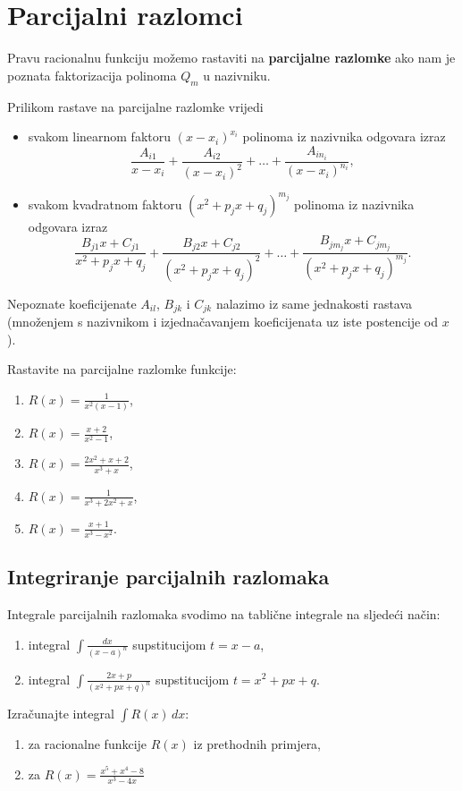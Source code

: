 
\section{Parcijalni razlomci}

Pravu racionalnu funkciju možemo rastaviti na \textbf{parcijalne razlomke} ako
nam je poznata faktorizacija polinoma $Q_m$ u nazivniku.

Prilikom rastave na parcijalne razlomke vrijedi
\begin{itemize}
    \item svakom linearnom faktoru $(x-x_i)^{x_i}$ polinoma iz nazivnika
    odgovara izraz
    $$
      \frac{A_{i1}}{x-x_i} + \frac{A_{i2}}{(x-x_i)^2} + \dots + \frac{A_{in_i}}{(x-x_i)^{n_i}},
    $$
    \item svakom kvadratnom faktoru $(x^2+p_jx+q_j)^{m_j}$ polinoma iz nazivnika
    odgovara izraz
    $$
      \frac{B_{j1}x+C_{j1}}{x^2+p_jx+q_j} + \frac{B_{j2}x+C_{j2}}{(x^2+p_jx+q_j)^2} + \dots + \frac{B_{jm_j}x+C_{jm_j}}{(x^2+p_jx+q_j)^{m_j}}.
    $$
\end{itemize}

Nepoznate koeficijenate $A_{il}$, $B_{jk}$ i $C_{jk}$ nalazimo iz same
jednakosti rastava (množenjem s nazivnikom i izjednačavanjem koeficijenata uz
iste postencije od $x$).

\begin{example}
    Rastavite na parcijalne razlomke funkcije:
    \begin{enumerate}
        \item $R(x)=\frac{1}{x^2(x-1)}$,
        \item $R(x)=\frac{x+2}{x^2-1}$,
        \item $R(x)=\frac{2x^2+x+2}{x^3+x}$,
        \item $R(x)=\frac{1}{x^3+2x^2+x}$,
        \item $R(x)=\frac{x+1}{x^3-x^2}$.
    \end{enumerate}
\end{example}

\subsection{Integriranje parcijalnih razlomaka}

Integrale parcijalnih razlomaka svodimo na tablične integrale na sljedeći način:

\begin{enumerate}
    \item integral $\int \frac{dx}{(x-a)^n}$ supstitucijom $t=x-a$,
    \item integral $\int \frac{2x+p}{(x^2+px+q)^n}$ supstitucijom $t=x^2+px+q$.
\end{enumerate}

\begin{example}
    Izračunajte integral $\int R(x)\,dx$:
    \begin{enumerate}
        \item za racionalne funkcije $R(x)$ iz prethodnih primjera,
        \item za $R(x) = \frac{x^5+x^4-8}{x^3-4x}$
    \end{enumerate}
\end{example}
